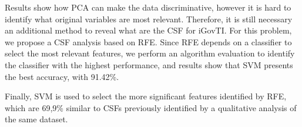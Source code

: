 Results show how PCA can make the data discriminative, however it is hard to identify what original variables are most relevant. Therefore, it is still necessary an additional method to reveal what are the CSF for iGovTI. For this problem, we propose a CSF analysis based on RFE. Since RFE depends on a classifier to select the most relevant features, we perform an algorithm evaluation to identify the classifier with the highest performance, and results show that SVM \cite{hearst1998support} presents the best accuracy, with 91.42\%. 

Finally, SVM is used to select the more significant features identified by RFE, which are 69,9\% similar to CSFs previously identified by a qualitative analysis of the same dataset.